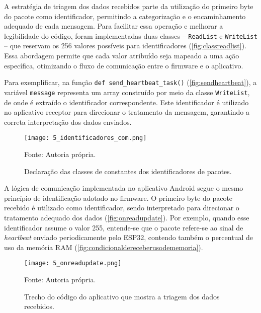 A estratégia de triagem dos dados recebidos parte da utilização do primeiro byte do pacote como identificador, permitindo a categorização e o encaminhamento adequado de cada mensagem. Para facilitar essa operação e melhorar a legibilidade do código, foram implementadas duas classes – \texttt{ReadList} e \texttt{WriteList} – que reservam os 256 valores possíveis para identificadores (\autoref{fig:classreadlist}). Essa abordagem permite que cada valor atribuído seja mapeado a uma ação específica, otimizando o fluxo de comunicação entre o firmware e o aplicativo.

Para exemplificar, na função \texttt{def send\_heartbeat\_task()} (\autoref{fig:sendheartbeat}), a variável \texttt{message} representa um array construído por meio da classe \texttt{WriteList}, de onde é extraído o identificador correspondente. Este identificador é utilizado no aplicativo receptor para direcionar o tratamento da mensagem, garantindo a correta interpretação dos dados enviados.

\begin{figure}[ht]
    \centering
    \caption{Declaração das classes de constantes dos identificadores de pacotes.}
    \label{fig:classreadlist}
    \texttt{[image: 5\_identificadores\_com.png]}

    {\centering\footnotesize Fonte: Autoria própria.\par}
\end{figure}

A lógica de comunicação implementada no aplicativo Android segue o mesmo princípio de identificação adotado no firmware. O primeiro byte do pacote recebido é utilizado como identificador, sendo interpretado para direcionar o tratamento adequado dos dados (\autoref{fig:onreadupdate}). Por exemplo, quando esse identificador assume o valor 255, entende-se que o pacote refere-se ao sinal de \textit{heartbeat} enviado periodicamente pelo ESP32, contendo também o percentual de uso da memória RAM (\autoref{fig:condicionaldereceberusodememoria}).

\begin{figure}[ht]
    \centering
    \caption{Trecho do código do aplicativo que mostra a triagem dos dados recebidos.}
    \label{fig:onreadupdate}
    \texttt{[image: 5\_onreadupdate.png]}

    {\centering\footnotesize Fonte: Autoria própria.\par}
\end{figure}

